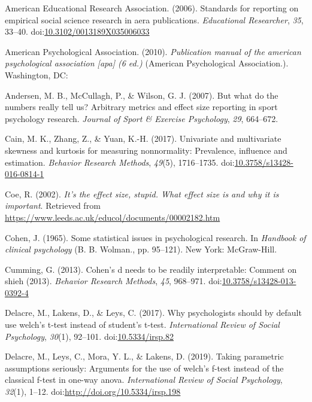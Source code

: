 \documentclass[
  man,floatsintext]{apa6}
\begin{document}
\leavevmode\hypertarget{ref-AERA_2006}{}%
American Educational Research Association. (2006). Standards for reporting on empirical social science research in aera publications. \emph{Educational Researcher}, \emph{35}, 33--40. doi:\href{https://doi.org/10.3102/0013189X035006033}{10.3102/0013189X035006033}

\leavevmode\hypertarget{ref-APA_2010}{}%
American Psychological Association. (2010). \emph{Publication manual of the american psychological association {[}apa{]} (6 ed.)} (American Psychological Association.). Washington, DC:

\leavevmode\hypertarget{ref-Andersen_et_al_2007}{}%
Andersen, M. B., McCullagh, P., \& Wilson, G. J. (2007). But what do the numbers really tell us? Arbitrary metrics and effect size reporting in sport psychology research. \emph{Journal of Sport \& Exercise Psychology}, \emph{29}, 664--672.

\leavevmode\hypertarget{ref-Cain_et_al_2017}{}%
Cain, M. K., Zhang, Z., \& Yuan, K.-H. (2017). Univariate and multivariate skewness and kurtosis for measuring nonnormality: Prevalence, influence and estimation. \emph{Behavior Research Methods}, \emph{49}(5), 1716--1735. doi:\href{https://doi.org/10.3758/s13428-016-0814-1}{10.3758/s13428-016-0814-1}

\leavevmode\hypertarget{ref-Coe_2002}{}%
Coe, R. (2002). \emph{It's the effect size, stupid. What effect size is and why it is important}. Retrieved from \url{https://www.leeds.ac.uk/educol/documents/00002182.htm}

\leavevmode\hypertarget{ref-Cohen_1965}{}%
Cohen, J. (1965). Some statistical issues in psychological research. In \emph{Handbook of clinical psychology} (B. B. Wolman., pp. 95--121). New York: McGraw-Hill.

\leavevmode\hypertarget{ref-Cumming_2013}{}%
Cumming, G. (2013). Cohen's d needs to be readily interpretable: Comment on shieh (2013). \emph{Behavior Research Methods}, \emph{45}, 968--971. doi:\href{https://doi.org/10.3758/s13428-013-0392-4}{10.3758/s13428-013-0392-4}

\leavevmode\hypertarget{ref-Delacre_et_al_2017}{}%
Delacre, M., Lakens, D., \& Leys, C. (2017). Why psychologists should by default use welch's t-test instead of student's t-test. \emph{International Review of Social Psychology}, \emph{30}(1), 92--101. doi:\href{https://doi.org/10.5334/irsp.82}{10.5334/irsp.82}

\leavevmode\hypertarget{ref-Delacre_et_al_2019}{}%
Delacre, M., Leys, C., Mora, Y. L., \& Lakens, D. (2019). Taking parametric assumptions seriously: Arguments for the use of welch's f-test instead of the classical f-test in one-way anova. \emph{International Review of Social Psychology}, \emph{32}(1), 1--12. doi:\href{https://doi.org/http://doi.org/10.5334/irsp.198}{http://doi.org/10.5334/irsp.198}
\end{document}
